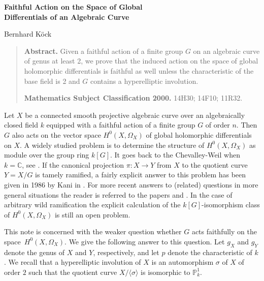 \documentclass[12pt,leqno]{article}
\newcommand{\CC}{{\mathbb C}}
\newcommand{\PP}{{\mathbb P}}
\begin{document}
\begin{center} {\bf\Large Faithful Action on the Space of Global\\
\vspace*{0.2cm} Differentials of an Algebraic Curve} \end{center}
\begin{center}\sc Bernhard K\"ock \end{center}

\bigskip

\begin{quote}
\footnotesize {\bf Abstract.} Given a faithful action of a
finite group $G$ on an algebraic curve of genus at least 2, we
prove that the induced action on the space of global
holomorphic differentials is faithful as well unless the
characteristic of the base field is  2 and $G$ contains a
hyperelliptic involution.


{\bf Mathematics Subject Classification 2000.} 14H30; 14F10;
11R32.

\end{quote}

\bigskip

Let $X$ be a connected smooth projective algebraic curve over
an algebraically closed field $k$ equipped with a faithful
action of a finite group $G$ of order $n$. Then $G$ also acts
on the vector space $H^0(X, \Omega_X)$ of global holomorphic
differentials on $X$. A widely studied problem is to determine
the structure of $H^0(X,\Omega_X)$ as module over the group
ring $k[G]$. It goes back to the Chevalley-Weil when $k = \CC$,
see \cite{CW}. If the canonical projection $\pi: X \rightarrow
Y$ from $X$ to the quotient curve $Y = X/G$ is tamely ramified,
a fairly explicit answer to this problem has been given in 1986
by Kani in \cite{Ka}. For more recent answers to (related)
questions in more general situations the reader is referred to
the papers \cite{Bo} and \cite{FWK}. In the case of arbitrary
wild ramification the explicit calculation of the
$k[G]$-isomorphism class of $H^0(X,\Omega_X)$ is still an open
problem.

This note is concerned with the weaker question whether $G$
acts faithfully on the space~$H^0(X,\Omega_X)$. We give the
following answer to this question. Let $g_X$ and $g_Y$ denote
the genus of $X$ and $Y$, respectively, and let $p$ denote the
characteristic of $k$. We recall that a hyperelliptic
involution of $X$ is an automorphism $\sigma$ of $X$ of order
$2$ such that the quotient curve $X/\langle \sigma \rangle$ is
isomorphic to $\PP^1_k$.
\end{document}
